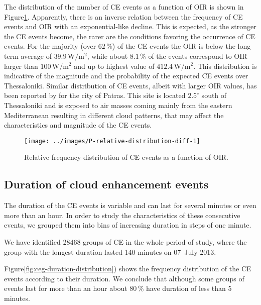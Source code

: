 \documentclass[preprint, 5p,
authoryear]{elsarticle} %
\begin{document}
The distribution of the number of CE events as a function of OIR is
shown in Figure\nobreakspace{}\ref{fig:ovir-distribution}. Apparently,
there is an inverse relation between the frequency of CE events and OIR
with an exponential-like decline. This is expected, as the stronger the
CE events become, the rarer are the conditions favoring the occurrence
of CE events. For the majority (over \(62\,\%\)) of the CE events the
OIR is below the long term average of \(39.9\,\text{W}/\text{m}^2\),
while about \(8.1\,\%\) of the events correspond to OIR larger than
\(100\,\text{W}/\text{m}^2\) and up to highest value of
\(412.4\,\text{W}/\text{m}^2\). This distribution is indicative of the
magnitude and the probability of the expected CE events over
Thessaloniki. Similar distribution of CE events, albeit with larger OIR
values, has been reported by \citet{Vamvakas2020} for the city of
Patras. This site is located \(2.5^\circ\) south of Thessaloniki and is
exposed to air masses coming mainly from the eastern Mediterranean
resulting in different cloud patterns, that may affect the
characteristics and magnitude of the CE events.

\begin{figure}

{\centering \texttt{[image: ../images/P-relative-distribution-diff-1]} 

}

\caption{Relative frequency distribution of CE events as a function of OIR.}\label{fig:ovir-distribution}
\end{figure}

\hypertarget{duration-of-cloud-enhancement-events}{%
\subsection{Duration of cloud enhancement
events}\label{duration-of-cloud-enhancement-events}}

The duration of the CE events is variable and can last for several
minutes or even more than an hour. In order to study the characteristics
of these consecutive events, we grouped them into bins of increasing
duration in steps of one minute.

We have identified 28468 groups of CE in the whole period of study,
where the group with the longest duration lasted 140 minutes on 07~July
2013.

Figure\nobreakspace{}\ref{fig:ceg-duration-distribution}) shows the
frequency distribution of the CE events according to their duration. We
conclude that although some groups of events last for more than an hour
about \(80\,\%\) have duration of less than 5 minutes.
\end{document}

